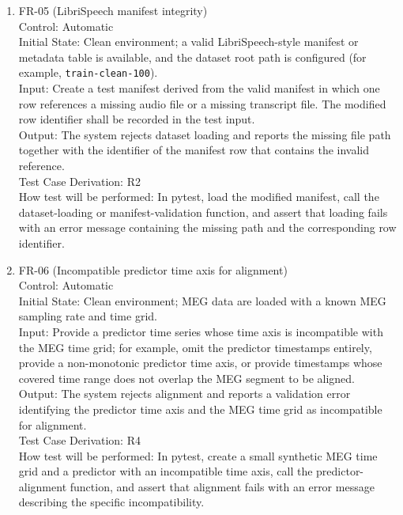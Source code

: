 \documentclass[12pt, titlepage]{article}
\begin{document}
\begin{enumerate}
\item{FR-05 (LibriSpeech manifest integrity)\\}
Control: Automatic \\
Initial State: Clean environment; a valid LibriSpeech-style manifest or metadata table is available, and the dataset root path is configured (for example, \texttt{train-clean-100}). \\
Input: Create a test manifest derived from the valid manifest in which one row references a missing audio file or a missing transcript file. The modified row identifier shall be recorded in the test input. \\
Output: The system rejects dataset loading and reports the missing file path together with the identifier of the manifest row that contains the invalid reference. \\
Test Case Derivation: R2 \\
How test will be performed: In pytest, load the modified manifest, call the
dataset-loading or manifest-validation function, and assert that loading fails with an error message containing the missing path and the corresponding row identifier.



\item{FR-06 (Incompatible predictor time axis for alignment)\\}
Control: Automatic \\
Initial State: Clean environment; MEG data are loaded with a known MEG sampling rate and time grid. \\
Input: Provide a predictor time series whose time axis is incompatible with the MEG time grid; for example, omit the predictor timestamps entirely, provide a non-monotonic predictor time axis, or provide timestamps whose covered time range does not overlap the MEG segment to be aligned. \\
Output: The system rejects alignment and reports a validation error identifying the predictor time axis and the MEG time grid as incompatible for alignment. \\
Test Case Derivation: R4 \\
How test will be performed: In pytest, create a small synthetic MEG time grid and a predictor with an incompatible time axis, call the predictor-alignment function, and assert that alignment fails with an error message describing the specific incompatibility.




\end{enumerate}
\end{document}
